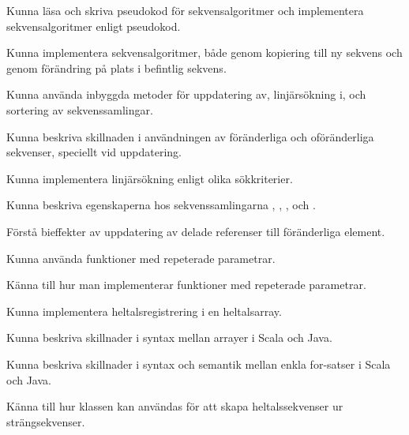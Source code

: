
\item Kunna läsa och skriva pseudokod för sekvensalgoritmer och implementera sekvensalgoritmer enligt pseudokod.

\item Kunna implementera sekvensalgoritmer, både genom kopiering till ny sekvens och genom förändring på plats i befintlig sekvens.

\item Kunna använda inbyggda metoder för uppdatering av, linjärsökning i, och sortering av sekvenssamlingar.

\item Kunna beskriva skillnaden i användningen av föränderliga och oföränderliga sekvenser, speciellt vid uppdatering.

\item Kunna implementera linjärsökning enligt olika sökkriterier.

\item Kunna beskriva egenskaperna hos sekvenssamlingarna , , ,  och .

\item Förstå bieffekter av uppdatering av delade referenser till föränderliga element.

\item Kunna använda funktioner med repeterade parametrar.

\item Känna till hur man implementerar funktioner med repeterade parametrar.

\item Kunna implementera heltalsregistrering i en heltalsarray.

\item Kunna beskriva skillnader i syntax mellan arrayer i Scala och Java.

\item Kunna beskriva skillnader i syntax och semantik mellan enkla for-satser i Scala och Java.


\item Känna till hur klassen  kan användas för att skapa heltalssekvenser ur strängsekvenser.
